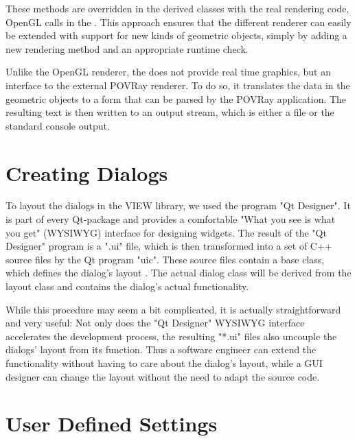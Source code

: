 These methods are overridden in the derived classes with the real rendering
code, \eg OpenGL calls in the . 
This approach ensures that the different renderer can easily be extended with support for 
new kinds of geometric objects, simply by adding a new rendering method and an appropriate 
runtime check.

Unlike the OpenGL renderer, the  does not provide real time graphics,
but an interface to the external POVRay renderer.
To do so, it translates the data in the geometric objects to a form that can be 
parsed by the POVRay application. 
The resulting text is then written to an output stream, which is either a
file or the standard console output.

\section{Creating Dialogs}
\label{designer}

To layout the dialogs in the VIEW library, we used the program "Qt Designer".
It is part of every Qt-package and provides a comfortable "What you see is what you get"
(WYSIWYG) interface for designing widgets.
The result of the "Qt Designer" program is a ".ui" file, which is then transformed 
into a set of C++ source files by the Qt program "uic".
These source files contain a base class, which defines the dialog's layout . 
The actual dialog class will be derived from the layout class and contains the dialog's
actual functionality.

While this procedure may seem a bit complicated, it is actually straightforward and 
very useful:
Not only does the "Qt Designer" WYSIWYG interface accelerates the development process, 
the resulting "*.ui" files also uncouple the dialogs' layout from its function. 
Thus a software engineer can extend the functionality without 
having to care about the dialog's layout, while a GUI designer can change the layout
without the need to adapt the source code.

\section{User Defined Settings}
\label{preferences}

